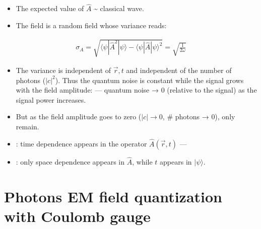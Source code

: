 \documentclass[letterpaper,10pt,english]{jupyterBook}
\begin{document}
\sphinxAtStartPar
{}
\begin{itemize}
\item {} 
\sphinxAtStartPar
The expected value of \(\hat A\) \textasciitilde{} classical wave.

\item {} 
\sphinxAtStartPar
The field is a random field whose variance reads:

\end{itemize}
\begin{equation*}
\begin{split}
\sigma_A=\sqrt{\langle\psi|\hat A^2|\psi\rangle-\langle\psi|\hat A|\psi\rangle^2}=\sqrt{\tfrac1{2\omega}}
\end{split}
\end{equation*}\begin{itemize}
\item {} 
\sphinxAtStartPar
{} The variance is independent of \(\vec r,t\) and independent of the number of photons (\(|c|^2\)). Thus the quantum noise is constant while the signal grows with the field amplitude:  — quantum noise → 0 (relative to the signal) as the signal power increases.

\item {} 
\sphinxAtStartPar
But as the field amplitude goes to zero (\(|c|\to0\), \# photons → 0), only  remain.

\end{itemize}

\sphinxAtStartPar
{}
\begin{itemize}
\item {} 
\sphinxAtStartPar
{}: time dependence appears in the operator \(\hat A(\vec r,t)\) — 

\item {} 
\sphinxAtStartPar
{}: only space dependence appears in \(\hat A\), while \(t\) appears in \(|\psi\rangle\).

\end{itemize}

\sphinxstepscope


\section{Photons \sphinxhyphen{} EM field quantization with Coulomb gauge}
\label{\detokenize{ch/quantum-mechanics/qft/photons-coulomb:photons-em-field-quantization-with-coulomb-gauge}}\label{\detokenize{ch/quantum-mechanics/qft/photons-coulomb:quantum-mechanics-qft-photons-coulomb}}\label{\detokenize{ch/quantum-mechanics/qft/photons-coulomb::doc}}
\end{document}

